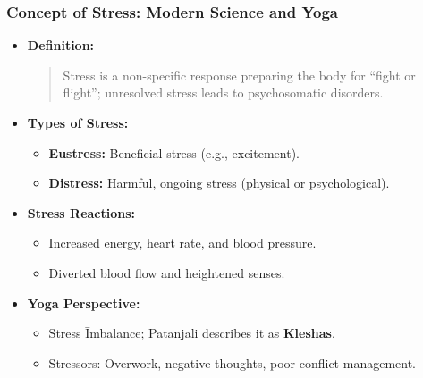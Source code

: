 \begin{frame}[fragile]\frametitle{Concept of Stress: Modern Science and Yoga}

    \begin{itemize}
        \item \textbf{Definition:}
        \begin{quote}
        Stress is a non-specific response preparing the body for ``fight or flight''; unresolved stress leads to psychosomatic disorders.
        \end{quote}
        \item \textbf{Types of Stress:}
        \begin{itemize}
            \item \textbf{Eustress:} Beneficial stress (e.g., excitement).
            \item \textbf{Distress:} Harmful, ongoing stress (physical or psychological).
        \end{itemize}
        \item \textbf{Stress Reactions:}
        \begin{itemize}
            \item Increased energy, heart rate, and blood pressure.
            \item Diverted blood flow and heightened senses.
        \end{itemize}
        \item \textbf{Yoga Perspective:}
        \begin{itemize}
            \item Stress \= Imbalance; Patanjali describes it as \textbf{Kleshas}.
            \item Stressors: Overwork, negative thoughts, poor conflict management.
        \end{itemize}
    \end{itemize}

\end{frame}

